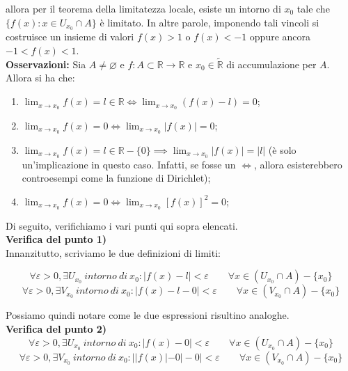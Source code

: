 \documentclass{article}
\begin{document}
\noindent allora per il teorema della limitatezza locale, esiste un intorno di $x_0$ tale che $\{f(x) : x \in U_{x_0} \cap A\}$ è limitato. In altre parole, imponendo tali vincoli si costruisce un insieme di valori $f(x) > 1$ o $f(x) < -1$ oppure ancora $-1 < f(x) < 1$. \\

\noindent\textbf{Osservazioni:} Sia $A \neq \varnothing$ e $f: A \subset \mathbb{R} \xrightarrow{} \mathbb{R}$ e $x_0 \in \widetilde{\mathbb{R}}$ di accumulazione per $A$. Allora si ha che:

\begin{enumerate}
    \item $\lim_{x \to x_0} f(x) = l \in \mathbb{R} \iff \lim_{x \to x_0} (f(x) - l) = 0$;
    \item $\lim_{x \to x_0} f(x) = 0 \iff \lim_{x \to x_0} |f(x)| = 0$;
    \item $\lim_{x \to x_0} f(x) = l \in \mathbb{R} - \{0\} \implies \lim_{x \to x_0} |f(x)| = |l|$ (è solo un'implicazione in questo caso. Infatti, se fosse un $\iff$, allora esisterebbero controesempi come la funzione di Dirichlet);
    \item $\lim_{x \to x_0} f(x) = 0 \iff \lim_{x \to x_0} [f(x)]^2 = 0$;
\end{enumerate}

\noindent Di seguito, verifichiamo i vari punti qui sopra elencati. \\

\noindent\textbf{Verifica del punto 1)}\\
\noindent Innanzitutto, scriviamo le due definizioni di limiti:

\begin{equation*}
    \forall \varepsilon > 0, \exists U_{x_0} \ intorno \ di \ x_0 : |f(x) - l| < \varepsilon \qquad \forall x \in (U_{x_0} \cap A) - \{x_0\}
\end{equation*}
\begin{equation*}
    \forall \varepsilon > 0, \exists V_{x_0} \ intorno \ di \ x_0 : |f(x) - l - 0| < \varepsilon \qquad \forall x \in (V_{x_0} \cap A) - \{x_0\}
\end{equation*}

\noindent Possiamo quindi notare come le due espressioni risultino analoghe.\\

\noindent\textbf{Verifica del punto 2)}\\
\begin{equation*}
    \forall \varepsilon > 0, \exists U_{x_0} \ intorno \ di \ x_0 : |f(x) - 0| < \varepsilon \qquad \forall x \in (U_{x_0} \cap A) - \{x_0\}
\end{equation*}
\begin{equation*}
    \forall \varepsilon > 0, \exists V_{x_0} \ intorno \ di \ x_0 : ||f(x)| - 0| - 0| < \varepsilon \qquad \forall x \in (V_{x_0} \cap A) - \{x_0\}
\end{equation*}
\end{document}
